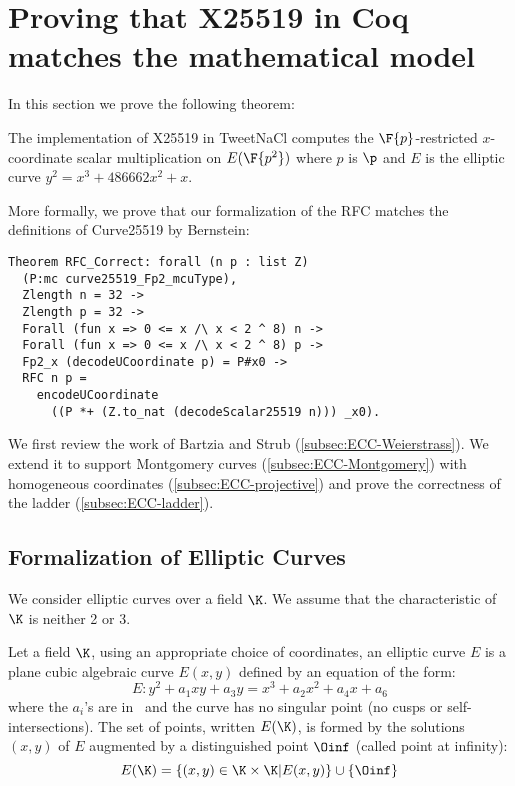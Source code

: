 \section{Proving that X25519 in Coq matches the mathematical model}
\label{sec:maths}

In this section we prove the following theorem:

\begin{informaltheorem}
The implementation of X25519 in TweetNaCl computes the
$\F{p}$-restricted $x$-coordinate scalar multiplication on $E(\F{p^2})$ where $p$ is $\p$
and $E$ is the elliptic curve $y^2 = x^3 + 486662 x^2 + x$.
\end{informaltheorem}

More formally, we prove that our formalization of the RFC matches the definitions of Curve25519 by Bernstein:
\begin{lstlisting}[language=Coq]
Theorem RFC_Correct: forall (n p : list Z)
  (P:mc curve25519_Fp2_mcuType),
  Zlength n = 32 ->
  Zlength p = 32 ->
  Forall (fun x => 0 <= x /\ x < 2 ^ 8) n ->
  Forall (fun x => 0 <= x /\ x < 2 ^ 8) p ->
  Fp2_x (decodeUCoordinate p) = P#x0 ->
  RFC n p =
    encodeUCoordinate
      ((P *+ (Z.to_nat (decodeScalar25519 n))) _x0).
\end{lstlisting}

We first review the work of Bartzia and Strub \cite{BartziaS14} (\ref{subsec:ECC-Weierstrass}).
We extend it to support Montgomery curves (\ref{subsec:ECC-Montgomery})
with homogeneous coordinates (\ref{subsec:ECC-projective}) and prove the
correctness of the ladder (\ref{subsec:ECC-ladder}).

\subsection{Formalization of Elliptic Curves}
\label{subsec:ECC}

We consider elliptic curves over a field $\K$. We assume that the
characteristic of $\K$ is neither 2 or 3.

\begin{dfn}
Let a field $\K$, using an appropriate choice of coordinates, an elliptic curve $E$
is a plane cubic algebraic curve $E(x,y)$ defined by an equation of the form:
$$E : y^2 + a_1 xy + a_3 y = x^3 + a_2 x^2 + a_4 x + a_6$$
where the $a_i$'s are in \K\ and the curve has no singular point (\ie no cusps
or self-intersections). The set of points, written $E(\K)$, is formed by the
solutions $(x,y)$ of $E$ augmented by a distinguished point $\Oinf$ (called point at infinity):
$$E(\K) = \{(x,y) \in \K \times \K | E(x,y)\} \cup \{\Oinf\}$$
\end{dfn}

